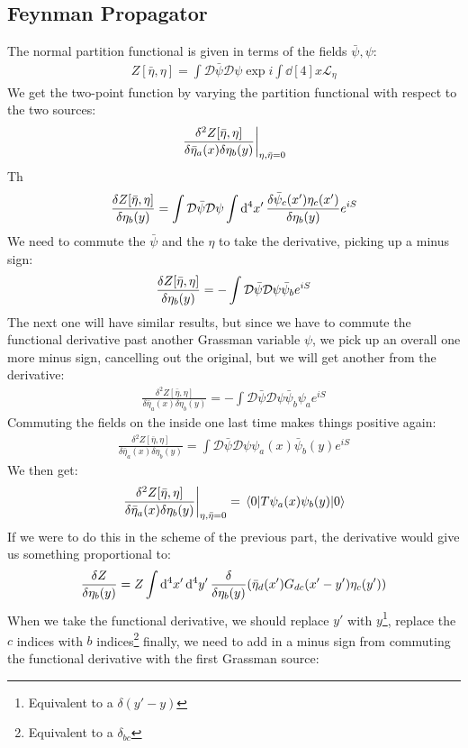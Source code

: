\documentclass[12pt]{article}
\renewcommand{\L}{\mathcal{L}}
\newcommand{\cD}{\mathcal{D}}
\newcommand{\psib}{\bar{\psi}}
\newcommand{\etab}{\bar{\eta}}
\begin{document}
\subsection{Feynman Propagator}
The normal partition functional is given in terms of the fields $\psib,\psi$:
\begin{align*}
  Z[\etab,\eta]=\int\cD\psib\cD\psi\exp{i\int\dd[4]{x}\L_\eta}
\end{align*}
We get the two-point function by varying the partition functional with respect to the two sources:
\begin{align*}
  \eval{\frac{\delta^2Z[\etab,\eta]}{\delta\etab_a(x)\delta\eta_b(y)}}_
  {\eta,\etab=0}
\end{align*}
Th
\begin{align*}
  \fdv{Z[\etab,\eta]}{\eta_b(y)}=\int\cD\psib\cD\psi\int\dd[4]{x'}
  \fdv{\psib_c(x')\eta_c(x')}{\eta_b(y)}e^{iS}
\end{align*}
We need to commute the $\psib$ and the $\eta$ to take the derivative, picking up a minus sign:
\begin{align*}
  \fdv{Z[\etab,\eta]}{\eta_b(y)}=-\int\cD\psib\cD\psi\psib_be^{iS}
\end{align*}
The next one will have similar results, but since we have to commute the functional derivative past another Grassman variable $\psi$, we pick up an overall one more minus sign, cancelling out the original, but we will get another from the derivative:
\begin{align*}
  \frac{\delta^2Z[\etab,\eta]}{\delta\etab_a(x)\delta\eta_b(y)}=
  -\int\cD\psib\cD\psi\psib_b\psi_ae^{iS}
\end{align*}
Commuting the fields on the inside one last time makes things positive again:
\begin{align*}
  \frac{\delta^2Z[\etab,\eta]}{\delta\etab_a(x)\delta\eta_b(y)}=
  \int\cD\psib\cD\psi\psi_a(x)\psib_b(y)e^{iS}
\end{align*}
We then get:
\begin{align*}
  \eval{\frac{\delta^2Z[\etab,\eta]}{\delta\etab_a(x)\delta\eta_b(y)}}_
  {\eta,\etab=0}=\mel{0}{T\psi_a(x)\psi_b(y)}{0}
\end{align*}
If we were to do this in the scheme of the previous part, the derivative would give us something proportional to:
\begin{align*}
  \fdv{Z}{\eta_b(y)}=Z\int\dd[4]{x'}\dd[4]{y'}\fdv{\eta_b(y)}
  \qty(\etab_d(x')G_{dc}(x'-y')\eta_c(y'))
\end{align*}
When we take the functional derivative, we should replace $y'$ with $y$\footnote{Equivalent to a $\delta(y'-y)$}, replace the $c$ indices with $b$ indices\footnote{Equivalent to a $\delta_{bc}$} finally, we need to add in a minus sign from commuting the functional derivative with the first Grassman source:
\end{document}
